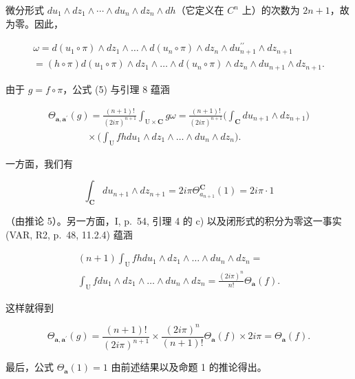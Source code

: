 微分形式 \(du_{1} \wedge dz_{1} \wedge \cdots \wedge du_{n} \wedge dz_{n} \wedge dh\)（它定义在 \(C^{n}\) 上）的次数为 \(2n + 1\)，故为零。因此，

\[
\begin{array}{l} \omega = d (u _ {1} \circ \pi) \wedge d z _ {1} \wedge \dots \wedge d (u _ {n} \circ \pi) \wedge d z _ {n} \wedge d u _ {n + 1} ^ {\prime \prime} \wedge d z _ {n + 1} \\ = (h \circ \pi) d (u _ {1} \circ \pi) \wedge d z _ {1} \wedge \dots \wedge d (u _ {n} \circ \pi) \wedge d z _ {n} \wedge d u _ {n + 1} \wedge d z _ {n + 1}. \end{array}
\]

由于 \(g = f \circ \pi\)，公式 (5) 与引理 8 蕴涵

\[
\begin{array}{c} \Theta_ {\boldsymbol {a}, \boldsymbol {a} ^ {\prime}} (g) = \frac {(n + 1) !}{(2 i \pi) ^ {n + 1}} \int_ {\mathrm{U} \times \mathbf {C}} g \omega = \frac {(n + 1) !}{(2 i \pi) ^ {n + 1}} \Big (\int_ {\mathbf {C}} d u _ {n + 1} \wedge d z _ {n + 1} \Big) \\ \qquad \qquad \times \Big (\int_ {\mathrm{U}} f h   d u _ {1} \wedge d z _ {1} \wedge \dots \wedge d u _ {n} \wedge d z _ {n} \Big). \end{array}
\]

一方面，我们有

\[
\int_ {\mathbf {C}} d u _ {n + 1} \wedge d z _ {n + 1} = 2 i \pi \Theta_ {a _ {n + 1}} ^ {\mathbf {C}} (1) = 2 i \pi \cdot 1
\]

（由推论 5）。另一方面，I, p.~54, 引理 4 的 c) 以及闭形式的积分为零这一事实 (VAR, R2, p.~48, 11.2.4) 蕴涵

\[
\begin{array}{c} (n + 1) \int_ {\mathrm{U}} f h d u _ {1} \wedge d z _ {1} \wedge \dots \wedge d u _ {n} \wedge d z _ {n} = \\ \int_ {\mathrm{U}} f   d u _ {1} \wedge d z _ {1} \wedge \dots \wedge d u _ {n} \wedge d z _ {n} = \frac {(2 i \pi) ^ {n}}{n !} \Theta_ {\boldsymbol {a}} (f). \end{array}
\]

这样就得到

\[
\Theta_ {\boldsymbol {a}, \boldsymbol {a} ^ {\prime}} (g) = \frac {(n + 1) !}{(2 i \pi) ^ {n + 1}} \times \frac {(2 i \pi) ^ {n}}{(n + 1) !} \Theta_ {\boldsymbol {a}} (f) \times 2 i \pi = \Theta_ {\boldsymbol {a}} (f).
\]

最后，公式 \(\Theta_{\boldsymbol{a}}(1)=1\) 由前述结果以及命题 1 的推论得出。

